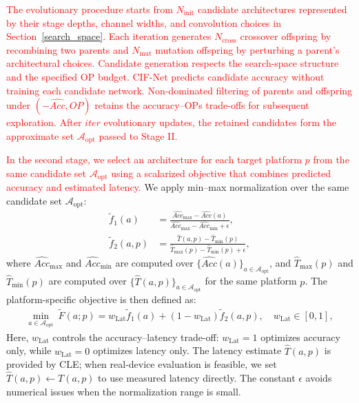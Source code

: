 \documentclass[a4paper,fleqn]{cas-sc}
\begin{document}
\textcolor{red}{The evolutionary procedure starts from $N_{\text{init}}$ candidate architectures represented by their stage depths, channel widths, and convolution choices in Section~\ref{search_space}. Each iteration generates $N_{\text{cross}}$ crossover offspring by recombining two parents and $N_{\text{mut}}$ mutation offspring by perturbing a parent's architectural choices. Candidate generation respects the search-space structure and the specified OP budget. CIF-Net predicts candidate accuracy without training each candidate network. Non-dominated filtering of parents and offspring under $(-\widehat{Acc},OP)$ retains the accuracy--OPs trade-offs for subsequent exploration. After $iter$ evolutionary updates, the retained candidates form the approximate set $\mathcal{A}_{\text{opt}}$ passed to Stage II.}

\textcolor{red}{In the second stage, we select an architecture for each target platform $p$ from the same candidate set $\mathcal{A}_{\text{opt}}$ using a scalarized objective that combines predicted accuracy and estimated latency.}
We apply min--max normalization over the same candidate set $\mathcal{A}_{\text{opt}}$:
\begin{align}
\tilde{f}_1(a) &= \frac{\widehat{Acc}_{\max}-\widehat{Acc}(a)}{\widehat{Acc}_{\max}-\widehat{Acc}_{\min}+\epsilon},
\label{eq:norm_acc}\\
\tilde{f}_2(a,p) &= \frac{\hat{T}(a,p)-\hat{T}_{\min}(p)}{\hat{T}_{\max}(p)-\hat{T}_{\min}(p)+\epsilon},
\label{eq:norm_lat}
\end{align}
where $\widehat{Acc}_{\max}$ and $\widehat{Acc}_{\min}$ are computed over $\{\widehat{Acc}(a)\}_{a\in\mathcal{A}_{\text{opt}}}$,
and $\hat{T}_{\max}(p)$ and $\hat{T}_{\min}(p)$ are computed over $\{\hat{T}(a,p)\}_{a\in\mathcal{A}_{\text{opt}}}$ for the same platform $p$.
The platform-specific objective is then defined as:
\begin{align}
\min_{a\in\mathcal{A}_{\text{opt}}}~ \tilde{F}(a;p)
= w_{\mathrm{Lat}} \tilde{f}_1(a) + (1-w_{\mathrm{Lat}}) \tilde{f}_2(a,p),
\quad w_{\mathrm{Lat}}\in[0,1],
\label{eq:final_objective}
\end{align}
Here, $w_{\mathrm{Lat}}$ controls the accuracy--latency trade-off: $w_{\mathrm{Lat}}=1$ optimizes accuracy only, while $w_{\mathrm{Lat}}=0$ optimizes latency only. The latency estimate $\hat{T}(a,p)$ is provided by CLE; when real-device evaluation is feasible, we set $\hat{T}(a,p) \leftarrow T(a,p)$ to use measured latency directly.
The constant $\epsilon$ avoids numerical issues when the normalization range is small.
\end{document}
